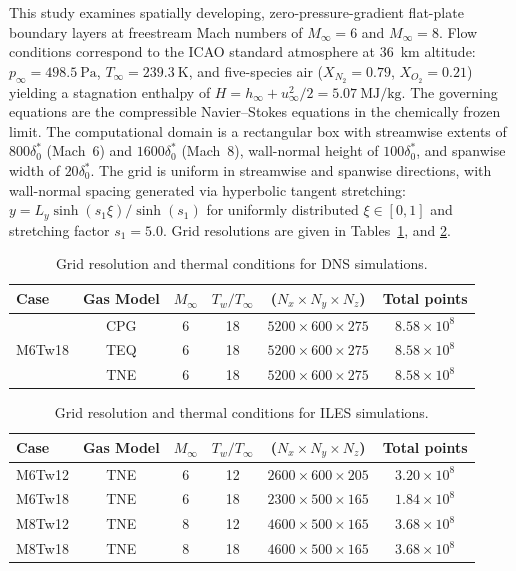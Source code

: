 This study examines spatially developing, zero-pressure-gradient flat-plate boundary layers at freestream Mach numbers of $M_\infty=6$ and $M_\infty=8$. Flow conditions correspond to the ICAO standard atmosphere at 36~km altitude: $p_\infty=498.5~\text{Pa}$, $T_\infty=239.3~\text{K}$, and five-species air ($X_{N_2}=0.79$, $X_{O_2}=0.21$) yielding a stagnation enthalpy of $H=h_\infty+u_\infty^2/2=5.07~\text{MJ/kg}$. The governing equations are the compressible Navier--Stokes equations in the chemically frozen limit. The computational domain is a rectangular box with streamwise extents of $800\delta^*_0$ (Mach~6) and $1600\delta^*_0$ (Mach~8), wall-normal height of $100\delta^*_0$, and spanwise width of $20\delta^*_0$. The grid is uniform in streamwise and spanwise directions, with wall-normal spacing generated via hyperbolic tangent stretching: $y = L_y \sinh(s_1 \xi)/\sinh(s_1)$ for uniformly distributed $\xi \in [0,1]$ and stretching factor $s_1 = 5.0$. Grid resolutions are given in Tables~\ref{tab:domain_grid_dns}, and \ref{tab:domain_grid_iles}.

\begin{table}[hbt!]
\centering
\caption{Grid resolution and thermal conditions for DNS simulations.}
\begin{tabular}{lccccc}
\toprule
Case & Gas Model & $M_\infty$ & $T_w/T_\infty$ &  ($N_x \times N_y \times N_z$) & Total points \\
\midrule
\multirow{3}{*}{M6Tw18} & CPG & 6 & 18 & $5200 \times 600 \times 275$ & $8.58\times 10^8$ \\
 & TEQ & 6 & 18 & $5200 \times 600 \times 275$ & $8.58\times 10^8$ \\
 & TNE & 6 & 18 & $5200 \times 600 \times 275$ & $8.58\times 10^8$ \\
\bottomrule
\end{tabular}
\label{tab:domain_grid_dns}
\end{table}

\begin{table}[hbt!]
\centering
\caption{Grid resolution and thermal conditions for ILES simulations.}
\begin{tabular}{lccccc}
\toprule
Case & Gas Model & $M_\infty$ & $T_w/T_\infty$ &  ($N_x \times N_y \times N_z$) & Total points \\
\midrule
M6Tw12 & TNE & 6 & 12 & $2600 \times 600 \times 205$ & $3.20\times 10^8$ \\
M6Tw18 & TNE & 6 & 18 & $2300 \times 500 \times 165$ & $1.84\times 10^8$ \\
M8Tw12 & TNE & 8 & 12 & $4600 \times 500 \times 165$ & $3.68\times 10^8$ \\
M8Tw18 & TNE & 8 & 18 & $4600 \times 500 \times 165$ & $3.68\times 10^8$ \\
\bottomrule
\end{tabular}
\label{tab:domain_grid_iles}
\end{table}

